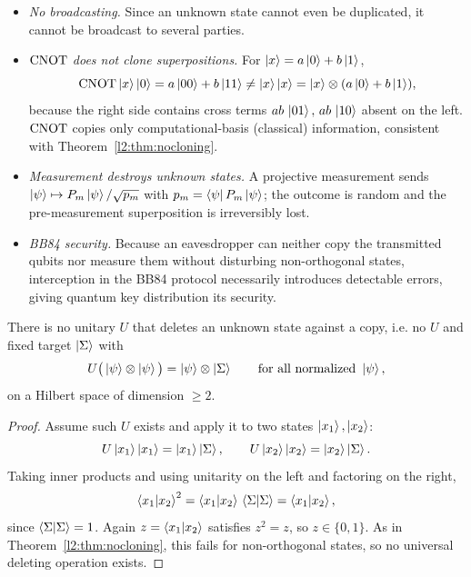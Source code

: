 \begin{remark}[Consequences]\leavevmode
\begin{itemize}[nosep]
  \item \emph{No broadcasting.} Since an unknown state cannot even be duplicated,
        it cannot be broadcast to several parties.
  \item \emph{$\mathrm{CNOT}$ does not clone superpositions.} For
        $\ket{x}=a\ket{0}+b\ket{1}$,
        \[
          \mathrm{CNOT}\ket{x}\ket{0}=a\ket{00}+b\ket{11}\neq\ket{x}\ket{x}
          =\ket{x}\otimes(a\ket{0}+b\ket{1}),
        \]
        because the right side contains cross terms $ab\,\ket{01},\,ab\,\ket{10}$
        absent on the left. $\mathrm{CNOT}$ copies only computational-basis
        (classical) information, consistent with Theorem~\ref{l2:thm:nocloning}.
  \item \emph{Measurement destroys unknown states.} A projective measurement
        sends $\ket{\psi}\mapsto P_{m}\ket{\psi}/\sqrt{p_{m}}$ with
        $p_{m}=\bra{\psi}P_{m}\ket{\psi}$; the outcome is random and the
        pre-measurement superposition is irreversibly lost.
  \item \emph{BB84 security.} Because an eavesdropper can neither copy the
        transmitted qubits nor measure them without disturbing non-orthogonal
        states, interception in the BB84 protocol necessarily introduces
        detectable errors, giving quantum key distribution its security.
\end{itemize}
\end{remark}

\begin{theorem}
\label{l2:thm:nodeleting}
There is no unitary $U$ that deletes an unknown state against a copy, i.e. no
$U$ and fixed target $\ket{\Sigma}$ with
\[
  U\big(\ket{\psi}\otimes\ket{\psi}\big)=\ket{\psi}\otimes\ket{\Sigma}
  \qquad\text{for all normalized } \ket{\psi},
\]
on a Hilbert space of dimension $\geq 2$.
\end{theorem}

\begin{proof}
Assume such $U$ exists and apply it to two states $\ket{x_{1}},\ket{x_{2}}$:
\[
  U\ket{x_{1}}\ket{x_{1}}=\ket{x_{1}}\ket{\Sigma},\qquad
  U\ket{x_{2}}\ket{x_{2}}=\ket{x_{2}}\ket{\Sigma}.
\]
Taking inner products and using unitarity on the left and factoring on the right,
\[
  \braket{x_{1}|x_{2}}^{2}=\braket{x_{1}|x_{2}}\,\braket{\Sigma|\Sigma}
                          =\braket{x_{1}|x_{2}},
\]
since $\braket{\Sigma|\Sigma}=1$. Again $z=\braket{x_{1}|x_{2}}$ satisfies
$z^{2}=z$, so $z\in\{0,1\}$. As in Theorem~\ref{l2:thm:nocloning}, this fails for
non-orthogonal states, so no universal deleting operation exists.
\end{proof}

